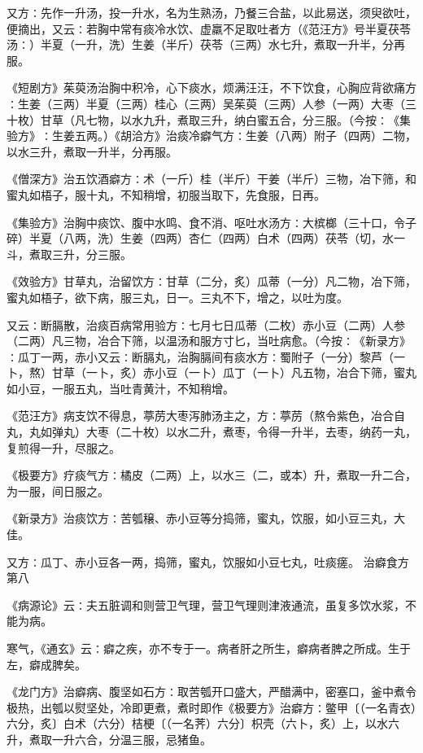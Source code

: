 \documentclass[a4paper,12pt,UTF8,twoside]{ctexbook}
\begin{document}
又方∶先作一升汤，投一升水，名为生熟汤，乃餐三合盐，以此易送，须臾欲吐，便摘出，又云∶若胸中常有痰冷水饮、虚羸不足取吐者方（《范汪方》号半夏茯苓汤∶）半夏（一升，洗）生姜（半斤）茯苓（三两）水七升，煮取一升半，分再服。

《短剧方》茱萸汤治胸中积冷，心下痰水，烦满汪汪，不下饮食，心胸应背欲痛方∶生姜（三两）半夏（三两）桂心（三两）吴茱萸（三两）人参（一两）大枣（三十枚）甘草（凡七物，以水九升，煮取三升，纳白蜜五合，分三服。（今按∶《集验方》∶生姜五两。）《胡洽方》治痰冷癖气方∶生姜（八两）附子（四两）二物，以水三升，煮取一升半，分再服。

《僧深方》治五饮酒癖方∶术（一斤）桂（半斤）干姜（半斤）三物，冶下筛，和蜜丸如梧子，服十丸，不知稍增，初服当取下，先食服，日再。

《集验方》治胸中痰饮、腹中水鸣、食不消、呕吐水汤方∶大槟榔（三十口，令子碎）半夏（八两，洗）生姜（四两）杏仁（四两）白术（四两）茯苓（切，水一斗，煮取三升，分三服。

《效验方》甘草丸，治留饮方∶甘草（二分，炙）瓜蒂（一分）凡二物，冶下筛，蜜丸如梧子，欲下病，服三丸，日一。三丸不下，增之，以吐为度。

又云∶断膈散，治痰百病常用验方∶七月七日瓜蒂（二枚）赤小豆（二两）人参（二两）凡三物，冶合下筛，以温汤和服方寸匕，当吐病愈。（今按∶《新录方》∶瓜丁一两，赤小又云∶断膈丸，治胸膈间有痰水方∶蜀附子（一分）黎芦（一卜，熬）甘草（一卜，炙）赤小豆（一卜）瓜丁（一卜）凡五物，冶合下筛，蜜丸如小豆，一服五丸，当吐青黄汁，不知稍增。

《范汪方》病支饮不得息，葶苈大枣泻肺汤主之，方∶葶苈（熬令紫色，冶合自丸，丸如弹丸）大枣（二十枚）以水二升，煮枣，令得一升半，去枣，纳药一丸，复煎得一升，尽服之。

《极要方》疗痰气方∶橘皮（二两）上，以水三（二，或本）升，煮取一升二合，为一服，间日服之。

《新录方》治痰饮方∶苦瓠穣、赤小豆等分捣筛，蜜丸，饮服，如小豆三丸，大佳。

又方∶瓜丁、赤小豆各一两，捣筛，蜜丸，饮服如小豆七丸，吐痰瘥。
治癖食方第八

《病源论》云∶夫五脏调和则营卫气理，营卫气理则津液通流，虽复多饮水浆，不能为病。

寒气，《通玄》云∶癖之疾，亦不专于一。病者肝之所生，癖病者脾之所成。生于左，癖成脾矣。

《龙门方》治癖病、腹坚如石方∶取苦瓠开口盛大，严醋满中，密塞口，釜中煮令极热，出瓠以熨坚处，冷即更煮，煮时即作《极要方》治癖方∶鳖甲〔（一名青衣）六分，炙〕白术（六分）桔梗〔（一名荠）六分〕枳壳（六卜，炙）上，以水六升，煮取一升六合，分温三服，忌猪鱼。
\end{document}
